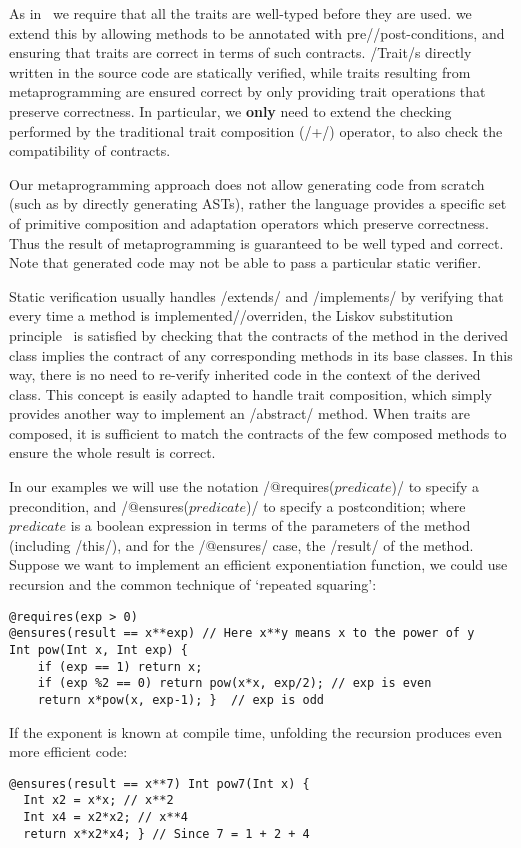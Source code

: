 As in~\cite{servetto2014meta}
we require that all the traits are well-typed
before they are used.
we extend this by allowing
methods to be annotated with pre//post-conditions, and 
ensuring that traits are correct in terms of such contracts.
/Trait/s directly written in the source code are statically verified, while traits resulting from metaprogramming are ensured correct by only providing trait operations that preserve correctness. 
In particular, we \textbf{only} need to extend the checking performed by the traditional trait composition (/+/)  operator, to also check the compatibility of contracts.

%
%
Our metaprogramming approach does not allow generating code from scratch (such as by directly generating ASTs), rather the language provides a specific set of primitive composition and adaptation operators which preserve correctness.
Thus the result of metaprogramming is guaranteed to be well typed and correct.
Note that generated code may not be able to pass a particular static verifier.


Static verification usually handles /extends/ and /implements/ by verifying that every 
time a method is implemented//overriden, 
the Liskov substitution principle~\cite{Liskov:1994:BNS:197320.197383} is satisfied
by checking that the contracts of the method in the derived class implies the contract of any corresponding methods in its base classes. 
 In this way, there is no need to re-verify
inherited code in the context of the derived class.
This concept is easily adapted
to handle trait composition, which simply provides another way to implement an /abstract/ method.
When traits are composed,
it is sufficient
to match the contracts of the few composed methods
to ensure the whole result is correct.

In our examples we will use the notation /@requires($predicate$)/ 
to specify a precondition, and /@ensures($predicate$)/ 
to specify a postcondition; where $predicate$ is a boolean expression
in terms of the parameters of the method (including /this/), and for the /@ensures/ case, the /result/ of the method.
Suppose we want to implement an efficient exponentiation function, we could use recursion and the common technique of `repeated squaring':
\vspace{-1ex}
\begin{lstlisting}
@requires(exp > 0)
@ensures(result == x**exp) // Here x**y means x to the power of y
Int pow(Int x, Int exp) {
	if (exp == 1) return x;
	if (exp %2 == 0) return pow(x*x, exp/2); // exp is even
	return x*pow(x, exp-1); }  // exp is odd
\end{lstlisting}
If the exponent is known at compile time,
unfolding the recursion produces even more efficient code:
\vspace{-1ex}
\begin{lstlisting}
@ensures(result == x**7) Int pow7(Int x) { 
  Int x2 = x*x; // x**2
  Int x4 = x2*x2; // x**4
  return x*x2*x4; } // Since 7 = 1 + 2 + 4
\end{lstlisting}
\vspace{-1ex}


